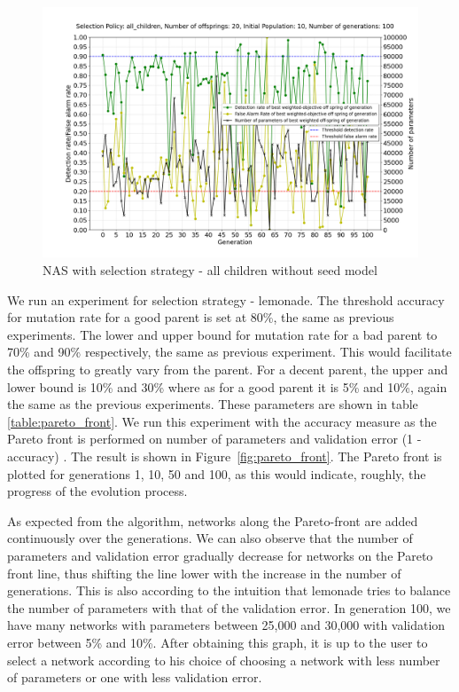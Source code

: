 \begin{figure}[ht!]
    \centering
        \includegraphics[width=1.0\linewidth, height=7.5cm]{BachelorMasterThesis/ExperimentsAndResults/Figures/all_children/all_children_3_3_5_no_seed_model_mutation_rate_10_30_5_10.png}
        \caption{NAS with selection strategy - all children without seed model}
        \label{fig:all_children_3_3_5_no_seed_model_mutation_rate_10_30_5_10}
\end{figure}

We run an experiment for selection strategy - lemonade. The threshold accuracy for mutation rate for a good parent is set at 80\%, the same as previous experiments. The lower and upper bound for mutation rate for a bad parent to 70\% and 90\% respectively, the same as previous experiment. This would facilitate the offspring to greatly vary from the parent. For a decent parent, the upper and lower bound is 10\% and 30\% where as for a good parent it is 5\% and 10\%, again the same as the previous experiments. These parameters are shown in table \ref{table:pareto_front}. We run this experiment with the accuracy measure as the Pareto front is performed on number of parameters and validation error (1 - accuracy) \cite{elsken2018efficient}. The result is shown in Figure~\ref{fig:pareto_front}. The Pareto front is plotted for generations 1, 10, 50 and 100, as this would indicate, roughly, the progress of the evolution process. 

As expected from the algorithm, networks along the Pareto-front are added continuously over the generations. We can also observe that the number of parameters and validation error gradually decrease for networks on the Pareto front line, thus shifting the line lower with the increase in the number of generations. This is also according to the intuition that lemonade tries to balance the number of parameters with that of the validation error. In generation 100, we have many networks with parameters between 25,000 and 30,000 with validation error between 5\% and 10\%. After obtaining this graph, it is up to the user to select a network according to his choice of choosing a network with less number of parameters or one with less validation error.

